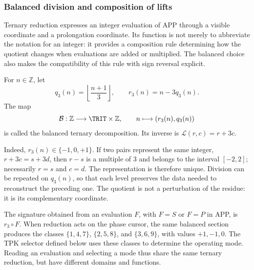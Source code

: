 \subsubsection{Balanced division and composition of lifts}
\label{trit-ampl-div-balanceada}

Ternary reduction expresses an integer evaluation of APP through a visible
coordinate and a prolongation coordinate. Its function is not merely to
abbreviate the notation for an integer: it provides a composition rule
determining how the quotient changes when evaluations are added or multiplied.
The balanced choice also makes the compatibility of this rule with sign
reversal explicit.

\begin{definition}
\label{trit-ampl-def-coordenadas}
For \(n\in\mathbb Z\), let
\[
 q_3(n)=\left\lfloor\frac{n+1}{3}\right\rfloor,\qquad
 r_3(n)=n-3q_3(n).
\]
The map
\[
 \mathcal B:\mathbb Z\longrightarrow\TRIT\times\mathbb Z,\qquad
 n\longmapsto(r_3(n),q_3(n))
\]
is called the balanced ternary decomposition. Its inverse is
\(\mathcal L(r,c)=r+3c\).
\end{definition}

Indeed, \(r_3(n)\in\{-1,0,+1\}\). If two pairs represent the same integer,
\(r+3c=s+3d\), then \(r-s\) is a multiple of \(3\) and belongs to the interval
\([-2,2]\); necessarily \(r=s\) and \(c=d\). The representation is therefore
unique. Division can be repeated on \(q_3(n)\), so that each level preserves
the data needed to reconstruct the preceding one. The quotient is not a
perturbation of the residue: it is its complementary coordinate.

The signature obtained from an evaluation \(F\), with \(F=S\) or \(F=P\) in APP,
is \(r_3\circ F\). When reduction acts on the phase cursor, the same balanced
section produces the classes \(\{1,4,7\}\), \(\{2,5,8\}\), and
\(\{3,6,9\}\), with values \(+1,-1,0\). The TPK selector defined below
uses these classes to determine the operating mode.
Reading an evaluation and selecting a mode thus share the same ternary
reduction, but have different domains and functions.

